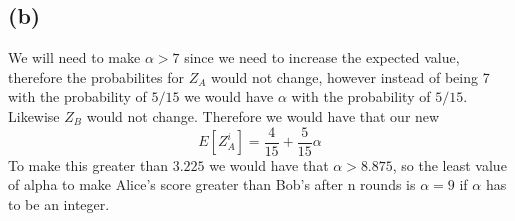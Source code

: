 \subsection*{(b)}
We will need to make $\alpha>7$ since we need to increase the expected value,
therefore the probabilites for $Z_A$ would not change, however instead 
of being 7 with the probability of $5/15$ we would have $\alpha$ with the
probability of $5/15$. Likewise $Z_B$ would not change. Therefore we would have that
our new 
$$E[Z_A^i]=\frac{4}{15}+\frac{5}{15}\alpha$$
To make this greater than $3.225$ we would have that
$\alpha>8.875$, so the least value of alpha to make Alice's
score greater than Bob's after n rounds is $\boxed{\alpha=9}$ if $\alpha$ has
to be an integer. 

